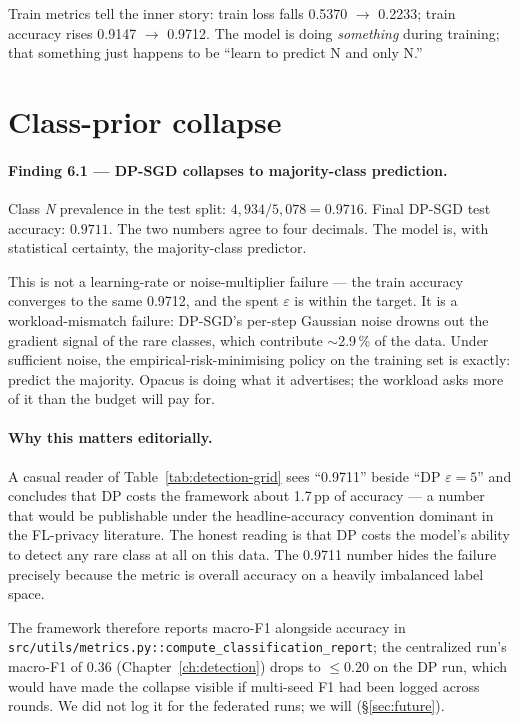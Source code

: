 \documentclass[11pt,a4paper]{report}
\begin{document}
Train metrics tell the inner story:
train loss falls 0.5370 $\to$ 0.2233; train accuracy rises 0.9147 $\to$
0.9712. The model is doing \emph{something} during training; that
something just happens to be ``learn to predict N and only N.''

\section{Class-prior collapse}\label{sec:f6.1}

\paragraph{Finding 6.1 --- DP-SGD collapses to majority-class prediction.}
Class \emph{N} prevalence in the test split: $4{,}934 / 5{,}078 = 0.9716$.
Final DP-SGD test accuracy: $0.9711$. The two numbers agree to four
decimals. The model is, with statistical certainty, the majority-class
predictor.

This is not a learning-rate or noise-multiplier failure --- the train
accuracy converges to the same 0.9712, and the spent $\varepsilon$ is
within the target. It is a workload-mismatch failure: DP-SGD's per-step
Gaussian noise drowns out the gradient signal of the rare classes, which
contribute $\sim$2.9\,\% of the data. Under sufficient noise, the
empirical-risk-minimising policy on the training set is exactly:
predict the majority. Opacus is doing what it advertises; the workload
asks more of it than the budget will pay for.

\paragraph{Why this matters editorially.}
A casual reader of Table~\ref{tab:detection-grid} sees ``0.9711''
beside ``DP $\varepsilon = 5$'' and concludes that DP costs the
framework about 1.7\,pp of accuracy --- a number that would be
publishable under the headline-accuracy convention dominant in the
FL-privacy literature. The honest reading is that DP costs the model's
ability to detect any rare class at all on this data. The 0.9711 number
hides the failure precisely because the metric is overall accuracy on a
heavily imbalanced label space.

The framework therefore reports macro-F1 alongside accuracy in
\texttt{src/utils/metrics.py::compute\_classification\_report}; the
centralized run's macro-F1 of 0.36 (Chapter~\ref{ch:detection}) drops to
$\le 0.20$ on the DP run, which would have made the collapse visible
if multi-seed F1 had been logged across rounds. We did not log it for
the federated runs; we will (\S\ref{sec:future}).
\end{document}
